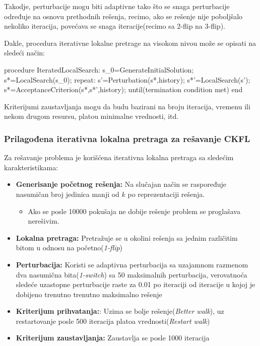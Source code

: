 \documentclass[a4paper]{article}
\begin{document}
Takodje, perturbacije mogu biti adaptivne tako što se snaga perturbacije određuje na osnovu prethodnih rešenja, recimo, ako se rešenje nije poboljšalo nekoliko iteracija, povećava se snaga iteracije(recimo sa 2-flip na 3-flip).

Dakle, procedura iterativne lokalne pretrage na visokom nivou može se opisati na sledeći način:

\begin{algorithm}
procedure IteratedLocalSearch:
	s_0=GenerateInitialSolution;
	s*=LocalSearch(s_0);
	repeat:
		s'=Perturbation(s*,history);
		s*'=LocalSearch(s');
		s*=AcceptanceCriterion(s*,s*',history);
	until(termination condition met)
end
\end{algorithm}

Kriterijumi zaustavljanja mogu da budu bazirani na broju iteracija, vremenu ili nekom drugom resursu, platou minimalne vrednosti, itd.

\subsubsection{Prilagođena iterativna lokalna pretraga za rešavanje CKFL}

Za rešavanje problema je korišćena iterativna lokalna pretraga sa sledećim karakteristikama:

\begin{itemize}
\item \textbf{Generisanje početnog rešenja:} Na slučajan način se raspoređuje nasumičan broj jedinica manji od $k$ po reprezentaciji rešenja.
	\begin{itemize}
		\item Ako se posle 10000 pokušaja ne dobije rešenje problem se proglašava nerešivim.
	\end{itemize}
\item \textbf{Lokalna pretraga:} Pretražuje se u okolini rešenja sa jednim različitim bitom u odnosu na početno(\emph{1-flip})
\item \textbf{Perturbacija:} Koristi se adaptivna perturbacija sa uzajamnom razmenom dva nasumična bita(\emph{1-switch}) sa 50 maksimalnih perturbacija, verovatnoća sledeće uzastopne perturbacije raste za 0.01 po iteraciji od iteracije u kojoj je dobijeno trenutno trenutno maksimalno rešenje
\item \textbf{Kriterijum prihvatanja:}: Uzima se bolje rešenje(\emph{Better walk}), uz restartovanje posle 500 iteracija platoa vrednosti(\emph{Restart walk})
\item \textbf{Kriterijum zaustavljanja:} Zaustavlja se posle 1000 iteracija
\end{itemize}
\end{document}
